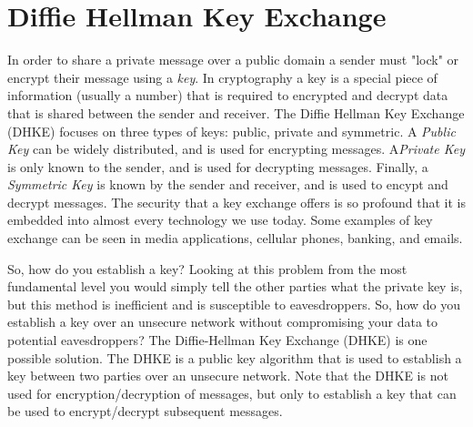 \section{Diffie Hellman Key Exchange}\label{sec:DHKE:1}

In order to share a private message over a public domain a sender must  "lock" or encrypt their message using a \emph{key}.  In cryptography a  key is a special piece of information (usually a number)  that is required to encrypted and decrypt data that is shared between the sender and receiver.  The Diffie Hellman Key Exchange (DHKE) focuses on three types of keys: public, private and symmetric.  A \emph{Public Key} can be widely distributed, and is used for encrypting messages.  A\emph{Private Key} is only known to the sender, and is used for decrypting messages.  Finally, a \emph{Symmetric Key} is known by the sender and receiver, and is used to encypt and decrypt messages.  The security that a key exchange offers is so profound that it is embedded into almost every technology we use today.  Some examples of key exchange can be seen in media applications, cellular phones, banking, and emails. 

So, how do you establish a key?  Looking at this problem from the most fundamental level you would simply tell the other parties what the private key is, but this method is inefficient and is susceptible to eavesdroppers.  So, how do you establish a key over an unsecure network without compromising your data to potential eavesdroppers?  The Diffie-Hellman Key Exchange (DHKE) is one possible solution.  The DHKE is a public key algorithm that is used to establish a key between two parties over an unsecure network.  Note that the DHKE is not used for encryption/decryption of messages, but only to establish a key that can be used to encrypt/decrypt subsequent messages.  

